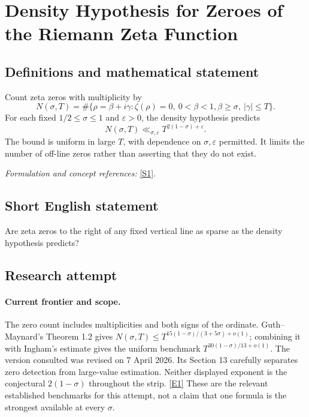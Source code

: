 \documentclass[11pt,a4paper]{article}
\newcommand{\sref}[2]{\hyperlink{source:#1:#2}{[S#2]}}
\newcommand{\eref}[2]{\hyperlink{extra:#1:#2}{[E#2]}}
\newif\ifshowcatalogue
\newcommand{\cataloguescope}[1]{\ifshowcatalogue
 \paragraph{Exact scope in the supplied catalogue.}
 \begin{quote}\small #1\end{quote}\fi}
\numberwithin{equation}{section}
\begin{document}
\setcounter{section}{127}
\clearpage
\section{\texorpdfstring{Density Hypothesis for Zeroes of the Riemann Zeta Function}{Density Hypothesis for Zeroes of the Riemann Zeta Function}}\label{128}
\subsection{Definitions and mathematical statement}
Count zeta zeros with multiplicity by
\[
 N(\sigma,T)=\#\{\rho=\beta+i\gamma:\zeta(\rho)=0,\ 0<\beta<1,
                                  \beta\ge\sigma,\ |\gamma|\le T\}.
\]
For each fixed $1/2\le\sigma\le1$ and $\varepsilon>0$, the density hypothesis predicts
\[
 N(\sigma,T)\ll_{\sigma,\varepsilon}T^{2(1-\sigma)+\varepsilon}.
\]
The bound is uniform in large $T$, with dependence on $\sigma,\varepsilon$ permitted. It limits the number of off-line zeros rather than asserting that they do not exist.
\par\smallskip\textit{Formulation and concept references:} \sref{128}{1}.
\cataloguescope{Prove that for every sigma with 1/2 <= sigma <= 1 and every epsilon > 0, the number N(sigma,T) of nontrivial zeros rho = beta + i gamma of the Riemann zeta function with beta >= sigma and |gamma| <= T satisfies N(sigma,T) <= C\_\{sigma,epsilon\} T\textasciicircum{}\{2(1-sigma)+epsilon\} for all sufficiently large T.}
\subsection{Short English statement}
Are zeta zeros to the right of any fixed vertical line as sparse as the density hypothesis predicts?
\subsection{Research attempt}

\paragraph{Current frontier and scope.}
The zero count includes multiplicities and both signs of the ordinate.
Guth--Maynard's Theorem 1.2 gives
$N(\sigma,T)\leq T^{15(1-\sigma)/(3+5\sigma)+o(1)}$; combining it with
Ingham's estimate gives the uniform benchmark
$T^{30(1-\sigma)/13+o(1)}$.  The version consulted was revised on
7 April 2026.  Its Section 13 carefully separates zero detection from
large-value estimation.  Neither displayed exponent is the conjectural
$2(1-\sigma)$ throughout the strip. \eref{128}{1}
These are the relevant established benchmarks for this attempt, not a
claim that one formula is the strongest available at every $\sigma$.
\end{document}
